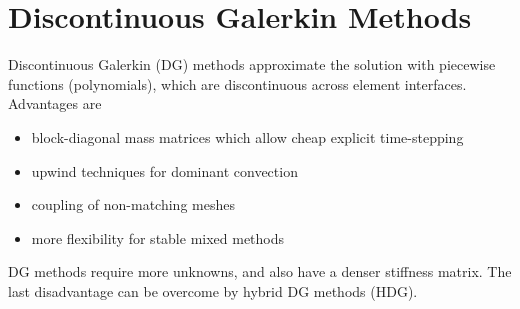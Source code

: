 








% 

\chapter{Discontinuous Galerkin Methods}
Discontinuous Galerkin (DG) methods approximate the solution with
piecewise functions (polynomials), which are discontinuous across
element interfaces. Advantages are
\begin{itemize}
\item block-diagonal mass matrices which allow cheap explicit
  time-stepping
\item upwind techniques for dominant convection
\item coupling of non-matching meshes
\item more flexibility for stable mixed methods
\end{itemize}
DG methods require more unknowns, and also have a denser stiffness
matrix. The last disadvantage can be overcome by hybrid DG methods (HDG).


